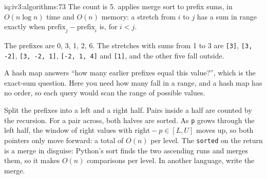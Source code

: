 \begin{solution}{iq:iv3:algorithms:73}
The count is 5.  applies merge sort to prefix sums, in $O(n \log n)$ time and $O(n)$ memory: a stretch from $i$ to $j$ has a sum in range exactly when $\text{prefix}_j - \text{prefix}_i$ is, for $i < j$.
\label{lst:iv3:al:rangesums}

The prefixes are 0, 3, 1, 2, 6. The stretches with sums from 1 to 3 are \texttt{[3]}, \texttt{[3, -2]}, \texttt{[3, -2, 1]}, \texttt{[-2, 1, 4]} and \texttt{[1]}, and the other five fall outside.

A hash map answers ``how many earlier prefixes equal this value?'', which is the exact-sum question. Here you need how many fall in a range, and a hash map has no order, so each query would scan the range of possible values.

Split the prefixes into a left and a right half. Pairs inside a half are counted by the recursion. For a pair across, both halves are sorted. As \texttt{p} grows through the left half, the window of right values with $\text{right} - p \in [L, U]$ moves up, so both pointers only move forward: a total of $O(n)$ per level. The \texttt{sorted} on the return is a merge in disguise: Python's sort finds the two ascending runs and merges them, so it makes $O(n)$ comparisons per level. In another language, write the merge.

\end{solution}

